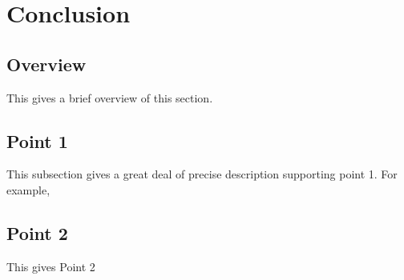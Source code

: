 \section{Conclusion}																	
\label{sec:Conclusion}

\subsection{Overview} 
This gives a brief overview of this section.

\subsection{Point 1}
This subsection gives a great deal of precise description supporting point 1.  For example,

\subsection{Point 2}
This gives Point 2
